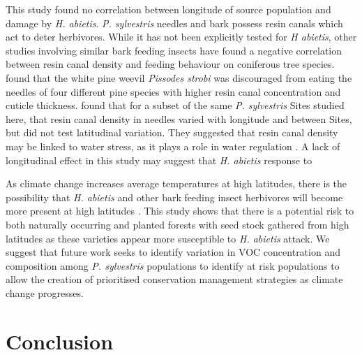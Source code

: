 \documentclass[a4paper, 11pt]{article}
\begin{document}
This study found no correlation between longitude of source population and damage by \textit{H. abietis}. \textit{P. sylvestris} needles and bark possess resin canals which act to deter herbivores. While it has not been explicitly tested for \textit{H abietis}, other studies involving similar bark feeding insects have found a negative correlation between resin canal density and feeding behaviour on coniferous tree species. \citet{Boucher2001} found that the white pine weevil \textit{Pissodes strobi} was discouraged from eating the needles of four different pine species with higher resin canal concentration and cuticle thickness. \citet{Donnelly2016} found that for a subset of the same \textit{P. sylvestris} Sites studied here, that resin canal density in needles varied with longitude and between Sites, but did not test latitudinal variation. They suggested that resin canal density may be linked to water stress, as it plays a role in water regulation \citep{Farrell1991}. A lack of longitudinal effect in this study may suggest that \textit{H. abietis} response to 

As climate change increases average temperatures at high latitudes, there is the possibility that \textit{H. abietis} and other bark feeding insect herbivores will become more present at high latitudes \citep{Inward2012}. This study shows that there is a potential risk to both naturally occurring and planted forests with seed stock gathered from high latitudes as these varieties appear more susceptible to \textit{H. abietis} attack. We suggest that future work seeks to identify variation in VOC concentration and composition among \textit{P. sylvestris} populations to identify at risk populations to allow the creation of prioritised conservation management strategies as climate change progresses.

\section*{Conclusion}
\end{document}
